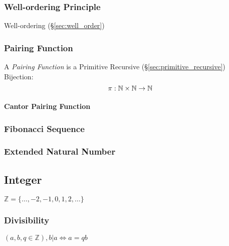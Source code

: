 \subsubsection{Well-ordering Principle}\label{sec:wellordering_principle}

Well-ordering (\S\ref{sec:well_order})



\subsubsection{Pairing Function}\label{sec:pairing_function}

A \emph{Pairing Function} is a Primitive Recursive
(\S\ref{sec:primitive_recursive}) Bijection:
\[
  \pi : \mathbb{N} \times \mathbb{N} \rightarrow \mathbb{N}
\]



\paragraph{Cantor Pairing Function}\label{sec:cantor_pairing}\hfill



\subsubsection{Fibonacci Sequence}\label{sec:fibonacci_sequence}

\subsubsection{Extended Natural Number}\label{sec:extended_natural}



\subsection{Integer}\label{sec:integer}

$\mathbb{Z} = \{ \ldots, -2, -1, 0, 1, 2, \ldots \}$



\subsubsection{Divisibility}\label{sec:divisibility}

$(a,b,q \in \mathbb{Z}), b|a \Leftrightarrow a = qb$

